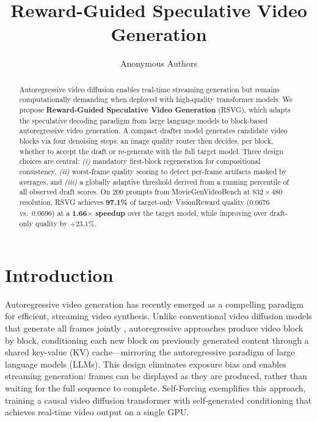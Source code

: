 \documentclass{article}
\title{%
  \Large\bfseries
  Reward-Guided Speculative Video Generation%
}
\author{Anonymous Authors}
\date{}
\begin{document}
\maketitle

\begin{abstract}
Autoregressive video diffusion enables real-time streaming generation but
remains computationally demanding when deployed with high-quality
transformer models.
We propose \textbf{Reward-Guided Speculative Video Generation}
(RSVG), which adapts the speculative decoding paradigm from large
language models to block-based autoregressive video generation.
A compact drafter model generates candidate video blocks via four
denoising steps; an image quality router then decides, per block,
whether to accept the draft or re-generate with the full target model.
Three design choices are central: \emph{(i)} mandatory first-block
regeneration for compositional consistency, \emph{(ii)} worst-frame
quality scoring to detect per-frame artifacts masked by averages, and
\emph{(iii)} a globally adaptive threshold derived from a running percentile
of all observed draft scores.
On 200 prompts from MovieGenVideoBench at $832{\times}480$ resolution,
RSVG achieves \textbf{97.1\%} of target-only VisionReward quality
(0.0676 vs.\ 0.0696) at a \textbf{1.66$\times$ speedup} over the target
model, while improving over draft-only quality by $+23.1\%$.
\end{abstract}

\section{Introduction}

Autoregressive video generation has recently emerged as a compelling
paradigm for efficient, streaming video synthesis.
Unlike conventional video diffusion models that generate all frames
jointly \citep{openaisora2024,moviegen2024}, autoregressive approaches
produce video block by block, conditioning each new block on previously
generated content through a shared key-value (KV) cache---mirroring the
autoregressive paradigm of large language models (LLMs).
This design eliminates exposure bias and enables streaming generation:
frames can be displayed as they are produced, rather than waiting for the
full sequence to complete.
Self-Forcing \citep{selfforcing2025} exemplifies this approach, training
a causal video diffusion transformer with self-generated conditioning that
achieves real-time video output on a single GPU.
\end{document}
